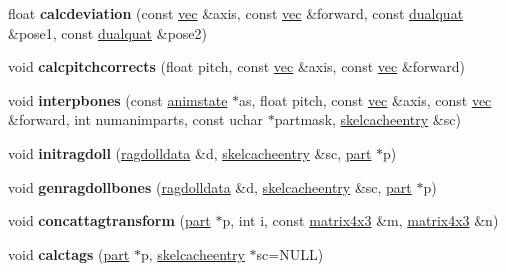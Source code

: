 \begin{DoxyCompactItemize}
float {\bfseries calcdeviation} (const \hyperlink{structvec}{vec} \&axis, const \hyperlink{structvec}{vec} \&forward, const \hyperlink{structdualquat}{dualquat} \&pose1, const \hyperlink{structdualquat}{dualquat} \&pose2)
\item 
\mbox{\label{structskelmodel_1_1skeleton_a364a7da06dacb6daa00257fb99ec4f66}} 
void {\bfseries calcpitchcorrects} (float pitch, const \hyperlink{structvec}{vec} \&axis, const \hyperlink{structvec}{vec} \&forward)
\item 
\mbox{\label{structskelmodel_1_1skeleton_a4e80f288958c2f0d0aebd7fffcff73e7}} 
void {\bfseries interpbones} (const \hyperlink{structanimmodel_1_1animstate}{animstate} $\ast$as, float pitch, const \hyperlink{structvec}{vec} \&axis, const \hyperlink{structvec}{vec} \&forward, int numanimparts, const uchar $\ast$partmask, \hyperlink{structskelmodel_1_1skelcacheentry}{skelcacheentry} \&sc)
\item 
\mbox{\label{structskelmodel_1_1skeleton_a75a88b661862d0f4f26bb15a9ba5f8bd}} 
void {\bfseries initragdoll} (\hyperlink{structragdolldata}{ragdolldata} \&d, \hyperlink{structskelmodel_1_1skelcacheentry}{skelcacheentry} \&sc, \hyperlink{structanimmodel_1_1part}{part} $\ast$p)
\item 
\mbox{\label{structskelmodel_1_1skeleton_a7f9f8be11f1e66bd57942b48740eb298}} 
void {\bfseries genragdollbones} (\hyperlink{structragdolldata}{ragdolldata} \&d, \hyperlink{structskelmodel_1_1skelcacheentry}{skelcacheentry} \&sc, \hyperlink{structanimmodel_1_1part}{part} $\ast$p)
\item 
\mbox{\label{structskelmodel_1_1skeleton_aab72e1f64d56baa1c3eecacf761678a9}} 
void {\bfseries concattagtransform} (\hyperlink{structanimmodel_1_1part}{part} $\ast$p, int i, const \hyperlink{structmatrix4x3}{matrix4x3} \&m, \hyperlink{structmatrix4x3}{matrix4x3} \&n)
\item 
\mbox{\label{structskelmodel_1_1skeleton_afc518702ddc3bd50e81512701b984914}} 
void {\bfseries calctags} (\hyperlink{structanimmodel_1_1part}{part} $\ast$p, \hyperlink{structskelmodel_1_1skelcacheentry}{skelcacheentry} $\ast$sc=N\+U\+LL)

\end{DoxyCompactItemize}
